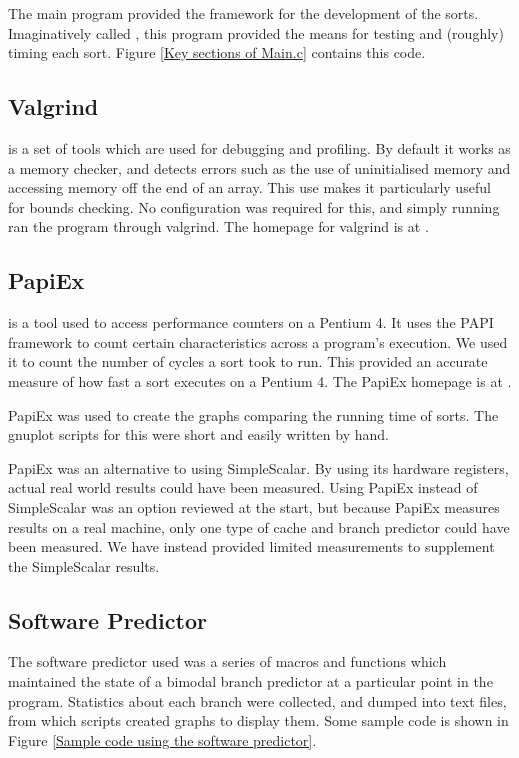 The main program provided the framework for the development of the sorts.
Imaginatively called , this program provided the means for testing
and (roughly) timing each sort. Figure \vref{Key sections of Main.c} contains
this code.


\subsection{Valgrind}
\label{Valgrind}
 is a set of tools which are used for debugging and profiling.  By
default it works as a memory checker, and detects errors such as the use of
uninitialised memory and accessing memory off the end of an array. This use
makes it particularly useful for bounds checking. No configuration was required
for this, and simply running  ran the program through
valgrind. The homepage for valgrind is at .

\subsection{PapiEx}
 is a tool used to access performance counters on a Pentium 4. It
uses the PAPI framework to count certain characteristics across a program's
execution. We used it to count the number of cycles a sort took to run. This
provided an accurate measure of how fast a sort executes on a Pentium 4. The
PapiEx homepage is at .

PapiEx was used to create the graphs comparing the running time of sorts.
The gnuplot scripts for this were short and easily written by hand.

PapiEx was an alternative to using SimpleScalar. By using its hardware
registers, actual real world results could have been measured. Using PapiEx
instead of SimpleScalar was an option reviewed at the start, but because PapiEx
measures results on a real machine, only one type of cache and branch predictor
could have been measured. We have instead provided limited measurements to
supplement the SimpleScalar results.

\subsection{Software Predictor}
The software predictor used was a series of macros and functions which
maintained the state of a bimodal branch predictor at a particular point in the
program. Statistics about each branch were collected, and dumped into text
files, from which scripts created graphs to display them. Some sample code is
shown in Figure \ref{Sample code using the software predictor}.

